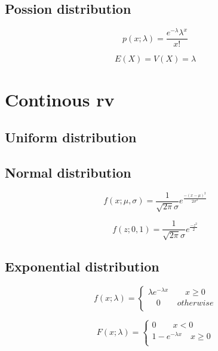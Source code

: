 \documentclass[UTF8]{ctexart}
\numberwithin{equation}{subsection}%
\begin{document}
	\subsection{Possion distribution}
	\begin{Large}
		\begin{equation}
		p(x;\lambda)=\frac{e^{-\lambda}\lambda^x}{x!}
		\end{equation}		
	\end{Large}
	\begin{Large}
		\begin{equation}
			E(X) = V(X)=\lambda
		\end{equation}		
	\end{Large}
    \section{Continous rv}
    \subsection{Uniform distribution}

	\subsection{Normal distribution}
	\begin{LARGE}
		\begin{equation}
			f(x;\mu, \sigma)=\frac{1}{\sqrt{2\pi}\sigma}e^{\frac{-(x-\mu)^2}{2\sigma^2}}
		\end{equation}		
	\end{LARGE}
	\begin{LARGE}
		\begin{equation}
			f(z;0, 1)=\frac{1}{\sqrt{2\pi}\sigma}e^{\frac{-z^2}{2}}
		\end{equation}		
	\end{LARGE}
    \subsection{Exponential distribution}
    \begin{Large}
    	\begin{equation}
    		f(x;\lambda)=\begin{cases}
    			\lambda e^{-\lambda x}\qquad x\geqslant 0\\
    			\quad 0\qquad otherwise\\
    		\end{cases}
    	\end{equation}		
    \end{Large}
	\begin{Large}
		\begin{equation}
			F(x;\lambda)=\begin{cases}
				0\qquad x<0\\
				1-e^{-\lambda x}\quad x\geqslant 0\\
			\end{cases}
		\end{equation}		
	\end{Large}
\end{document}
